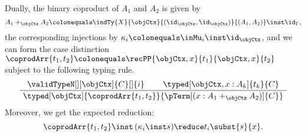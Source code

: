 \documentclass[preprint]{sigplanconf}
\begin{document}
\begin{example}
  Dually, the binary coproduct of $A_1$ and $A_2$ is given by
  \begin{equation*}
    A_1 +_{\objCtx} A_2 \colonequals
    \indTy{X}{\objCtx}{(\id_\objCtx, \id_\objCtx)}{(A_1, A_2)}
    \inst \id_{\Gamma},
  \end{equation*}
  the corresponding injections by
  $\kappa_i \colonequals \inMu_i \inst \id_\objCtx$,
  and we can form the case distinction
  $\coprodArr{t_1, t_2} \colonequals \recPP{\objCtx, x}{t_1}{\objCtx, x}{t_2}$
  subject to the following typing rule.
  \begin{equation*}
    \AxiomC{$\validTypeN[][\objCtx]{C}[]{i}$}
    \AxiomC{$\typed[\objCtx, x : A_k]{t_k}{C}$}
    \BinaryInfC{$
      \typed[\objCtx]{\coprodArr{t_1,t_2}}
      {\pTerm[(x : A_1 +_\objCtx A_2)]{C}}$}
    \DisplayProof
  \end{equation*}
  Moreover, we get the expected reduction:
  \begin{equation*}
    \coprodArr{t_1,t_2} \inst \, (\kappa_i \inst s)
    \reduce t_i \subst{s}{x}.
  \end{equation*}
\end{example}
\end{document}
